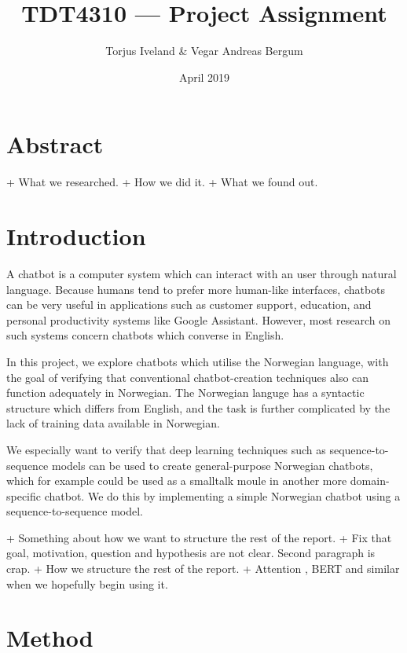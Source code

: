 \documentclass{article}
\title{TDT4310 --- Project Assignment}
\author{Torjus Iveland \& Vegar Andreas Bergum}
\date{April 2019}
\begin{document}
\maketitle

\section{Abstract}

+ What we researched.
+ How we did it.
+ What we found out.

\section{Introduction}

A chatbot is a computer system which can interact with an user through natural language. Because
humans tend to prefer more human-like interfaces, chatbots can be very useful in applications
such as customer support, education, and personal productivity systems like Google Assistant.
However, most research on such systems concern chatbots which converse in English.

In this project, we explore chatbots which utilise the Norwegian language, with the goal of
verifying that conventional chatbot-creation techniques also can function adequately in
Norwegian. The Norwegian languge has a syntactic structure which differs from English, and
the task is further complicated by the lack of training data available in Norwegian.

We especially want to verify that deep learning techniques such as sequence-to-sequence
models can be used to create general-purpose Norwegian chatbots, which for example could be used
as a smalltalk moule in another more domain-specific chatbot. We do this by implementing a simple
Norwegian chatbot using a sequence-to-sequence \cite{Cho2014} model.

+ Something about how we want to structure the rest of the report.
+ Fix that goal, motivation, question and hypothesis are not clear. Second paragraph is crap.
+ How we structure the rest of the report.
+ Attention \cite{Bahdanau2015}, BERT and similar when we hopefully begin using it.

\section{Method}

\end{document}
